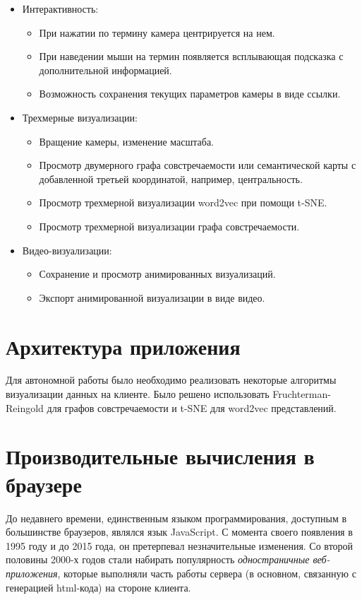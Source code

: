 \begin{itemize}
\item Интерактивность:
  \begin{itemize}
  \item При нажатии по термину камера центрируется на нем.
  \item При наведении мыши на термин появляется всплывающая подсказка с дополнительной информацией.
  \item Возможность сохранения текущих параметров камеры в виде ссылки.
  \end{itemize}

\item Трехмерные визуализации:
  \begin{itemize}
  \item Вращение камеры, изменение масштаба.
  \item Просмотр двумерного графа совстречаемости или семантической карты с добавленной третьей координатой, например, центральность.
  \item Просмотр трехмерной визуализации word2vec при помощи t-SNE.
  \item Просмотр трехмерной визуализации графа совстречаемости.
  \end{itemize}

\item Видео-визуализации:
  \begin{itemize}
  \item Сохранение и просмотр анимированных визуализаций.
  \item Экспорт анимированной визуализации в виде видео.
  \end{itemize}
\end{itemize}

\section{Архитектура приложения}

Для автономной работы было необходимо реализовать некоторые алгоритмы визуализации данных на клиенте. Было решено использовать Fruchterman-Reingold для графов совстречаемости и t-SNE для word2vec представлений.

\section{Производительные вычисления в браузере}

До недавнего времени, единственным языком программирования, доступным в большинстве браузеров, являлся язык JavaScript. С момента своего появления в 1995 году и до 2015 года, он претерпевал незначительные изменения. Со второй половины 2000-х годов стали набирать популярность {\itshape одностраничные веб-приложения}, которые выполняли часть работы сервера (в основном, связанную с генерацией html-кода) на стороне клиента.

